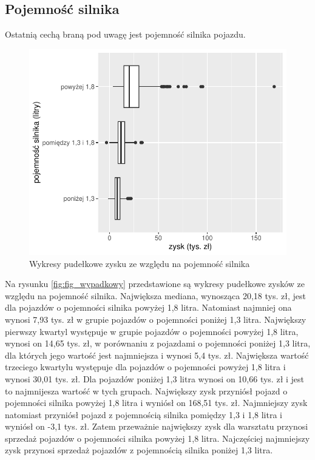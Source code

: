 \documentclass{article}\usepackage[]{graphicx}\usepackage[]{xcolor}
\makeatletter
\def\maxwidth{ %
  \ifdim\Gin@nat@width>\linewidth
    \linewidth
  \else
    \Gin@nat@width
  \fi
}
\newenvironment{knitrout}{}{} %
\makeatother
\begin{document}
\subsection{Pojemność silnika}

Ostatnią cechą braną pod uwagę jest pojemność silnika pojazdu.

\begin{knitrout}
\color{fgcolor}\begin{figure}[H]

{\centering \includegraphics[width=\maxwidth]{figure/fig_pojemnosc-1} 

}

\caption[Wykresy pudełkowe zysku ze względu na pojemność silnika]{Wykresy pudełkowe zysku ze względu na pojemność silnika}\label{fig:fig_pojemnosc}
\end{figure}

\end{knitrout}

Na rysunku \ref{fig:fig_wypadkowy} przedstawione są wykresy pudełkowe zysków ze względu na pojemność silnika. Największa mediana, wynosząca 20,18 tys. zł, jest dla pojazdów o pojemności silnika powyżej 1,8 litra. Natomiast najmniej ona wynosi 7,93 tys. zł w grupie pojazdów o pojemności poniżej 1,3 litra. 
Największy pierwszy kwartyl występuje w grupie pojazdów o pojemności powyżej 1,8 litra, wynosi on 14,65 tys. zł, w porównaniu z pojazdami o pojemności poniżej 1,3 litra, dla których jego wartość jest najmniejsza i wynosi 5,4 tys. zł.
Największa wartość trzeciego kwartylu występuje dla pojazdów o pojemności powyżej 1,8 litra i wynosi 30,01 tys. zł. Dla pojazdów poniżej 1,3 litra wynosi on 10,66 tys. zł i jest to najmnijesza wartość w tych grupach.
Największy zysk przyniósł pojazd o pojemności silnika powyżej 1,8 litra i wyniósł on 168,51 tys. zł. 
Najmniejszy zysk natomiast przyniósł pojazd z pojemnością silnika pomiędzy 1,3 i 1,8 litra i wyniósł on -3,1 tys. zł. Zatem przeważnie największy zysk dla warsztatu przynosi sprzedaż pojazdów o pojemności silnika powyżej 1,8 litra. Najczęściej najmniejszy zysk przynosi sprzedaż pojazdów z pojemnością silnika poniżej 1,3 litra.
\end{document}
